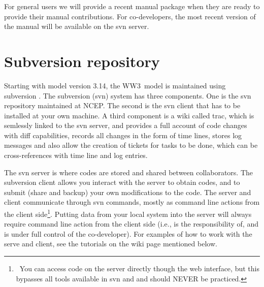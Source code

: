 \documentclass[12pt]{article}
\newcommand{\ws}{WW3}
\newcommand{\file}{\sf}
\newcommand{\pb}{\strut \vfill \pagebreak}
\newcommand{\bpage}{\vfill \pagebreak \strut

\vspace{2.5in} \centerline{This page is intentionally left blank.}}
\newcommand{\newsec}{\setcounter{equation}{0}
                      \setcounter{myfigno}{0}
                      \setcounter{mytabno}{0}}
\newcounter{myfigno}[section]
\newcounter{mytabno}[section]
\begin{document}
\noindent
For general users we will provide a recent manual package when they are ready
to provide their manual contributions. For co-developers, the most recent
version of the manual will be available on the svn server.



\pb
\section{Subversion repository} \label{sec:svn}
\newsec

Starting with model version 3.14, the \ws\ model is maintained using
subversion \citep{bk:CSea06}. The subversion (svn) system has three
components. One is the svn repository maintained at NCEP. The second is the svn
client that has to be installed at your own machine. A third component is a wiki
called trac, which is semlessly linked to the svn server, and provides a full
account of code changes with diff capabilities, records all changes in the form of
time lines, stores log messages and also allow the creation of tickets for tasks to
be done, which can be cross-references with time line and log entries.

The svn server is where codes are stored and shared between collaborators. The
subversion client allows you interact with the server to obtain codes, and to
submit (share and backup) your own modifications to the code. The server and
client communicate through svn commands, mostly as command line actions from
the client side\footnote{~You can access code on the server directly though
the web interface, but this bypasses all tools available in svn and and should
NEVER be practiced.}. Putting data from your local system into the server will
always require command line action from the client side (i.e., is the
responsibility of, and is under full control of the co-developer). For
examples of how to work with the serve and client, see the tutorials on the
wiki page mentioned below.
\end{document}
